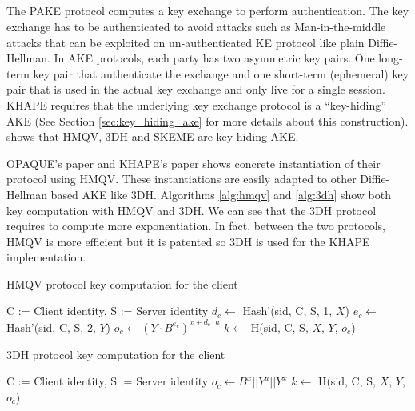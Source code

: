 ﻿\documentclass[../report.tex]{subfiles}
\begin{document}
\subsection{}
The PAKE protocol computes a key exchange to perform authentication. The key exchange has to be authenticated to avoid attacks such as Man-in-the-middle attacks that can be exploited on un-authenticated KE protocol like plain Diffie-Hellman.
In AKE protocols, each party has two asymmetric key pairs.
One long-term key pair that authenticate the exchange and one short-term (ephemeral) key pair that is used in the actual key exchange and only live for a single session.
KHAPE requires that the underlying key exchange protocol is a ``key-hiding'' AKE (See Section \ref{sec:key_hiding_ake} for more details about this construction).
\cite{KHAPE_Paper} shows that HMQV, 3DH and SKEME are key-hiding AKE.

OPAQUE's paper \cite{OPAQUE_Paper} and KHAPE's paper \cite{KHAPE_Paper} shows concrete instantiation of their protocol using HMQV. These instantiations are easily adapted to other Diffie-Hellman based AKE like 3DH.
Algorithms \ref{alg:hmqv} and \ref{alg:3dh} show both key computation with HMQV and 3DH. We can see that the 3DH protocol requires to compute more exponentiation.
In fact, between the two protocols, HMQV is more efficient but it is patented so 3DH is used for the KHAPE implementation.


\begin{algorithm}
\caption{HMQV protocol key computation for the client}
\label{alg:hmqv}
\begin{algorithmic}
\Require C := Client identity, S := Server identity
\State $d_c \gets$ Hash'(sid, C, S, 1, $X$)
\State $e_c \gets$ Hash'(sid, C, S, 2, $Y$)
\State $o_c \gets (Y \cdot B^{e_c})^{x+d_c \cdot a}$
\State $k \gets$ H(sid, C, S, $X$, $Y$, $o_c$)
\end{algorithmic}
\end{algorithm}


\begin{algorithm}
\caption{3DH protocol key computation for the client}
\label{alg:3dh}
\begin{algorithmic}
\Require C := Client identity, S := Server identity
\State $o_c \gets B^x || Y^a || Y^x$
\State $k \gets$ H(sid, C, S, $X$, $Y$, $o_c$)
\end{algorithmic}
\end{algorithm}
\end{document}
